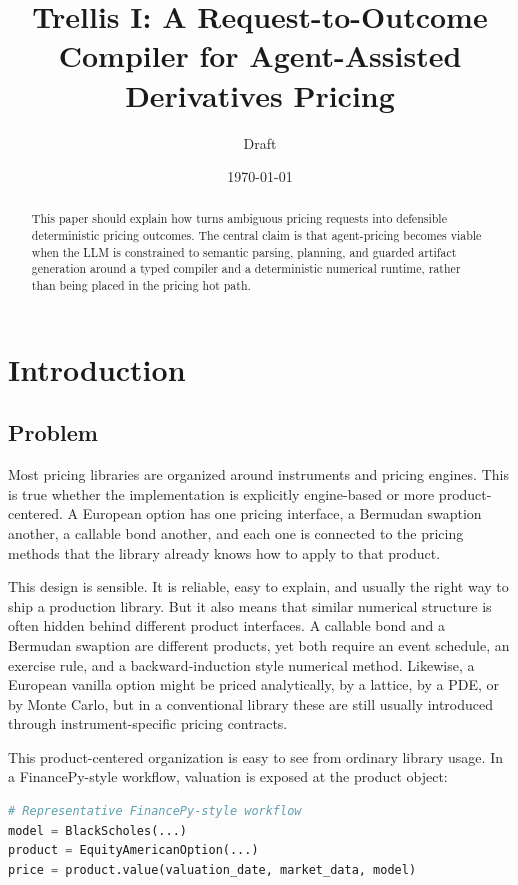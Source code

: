 \documentclass[11pt]{article}
\title{Trellis I: A Request-to-Outcome Compiler for Agent-Assisted Derivatives Pricing}
\author{Draft}
\date{\today}
\begin{document}
\maketitle

\begin{abstract}
This paper should explain how \trellis{} turns ambiguous pricing requests into
defensible deterministic pricing outcomes. The central claim is that
agent-pricing becomes viable when the LLM is constrained to semantic parsing,
planning, and guarded artifact generation around a typed compiler and a
deterministic numerical runtime, rather than being placed in the pricing hot
path.
\end{abstract}

\tableofcontents

\section{Introduction}

\subsection{Problem}
Most pricing libraries are organized around instruments and pricing engines.
This is true whether the implementation is explicitly engine-based or more
product-centered. A European option has one pricing interface, a Bermudan
swaption another, a callable bond another, and each one is connected to the
pricing methods that the library already knows how to apply to that product.

This design is sensible. It is reliable, easy to explain, and usually the
right way to ship a production library. But it also means that similar
numerical structure is often hidden behind different product interfaces. A
callable bond and a Bermudan swaption are different products, yet both require
an event schedule, an exercise rule, and a backward-induction style numerical
method. Likewise, a European vanilla option might be priced analytically, by a
lattice, by a PDE, or by Monte Carlo, but in a conventional library these are
still usually introduced through instrument-specific pricing contracts.

This product-centered organization is easy to see from ordinary library usage.
In a FinancePy-style workflow, valuation is exposed at the product object:

\begin{lstlisting}[language=Python]
# Representative FinancePy-style workflow
model = BlackScholes(...)
product = EquityAmericanOption(...)
price = product.value(valuation_date, market_data, model)
\end{lstlisting}
\end{document}
